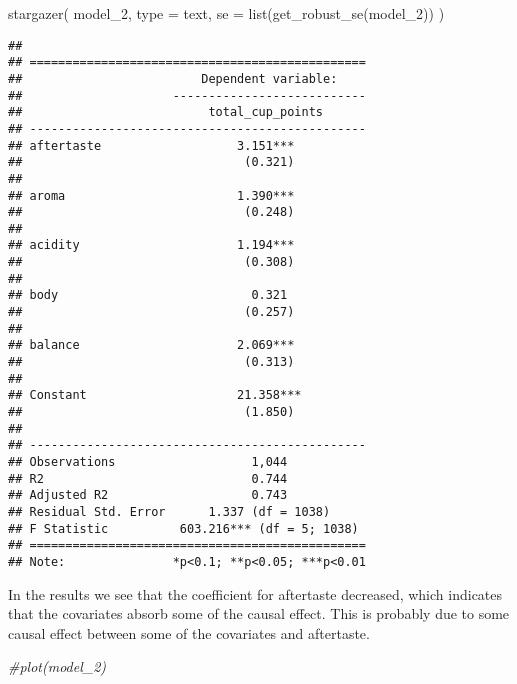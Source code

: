 \documentclass[
]{article}
\newenvironment{Shaded}{\begin{snugshade}}{\end{snugshade}}
\newcommand{\AttributeTok}[1]{\textcolor[rgb]{0.77,0.63,0.00}{#1}}
\newcommand{\CommentTok}[1]{\textcolor[rgb]{0.56,0.35,0.01}{\textit{#1}}}
\newcommand{\FunctionTok}[1]{\textcolor[rgb]{0.00,0.00,0.00}{#1}}
\newcommand{\NormalTok}[1]{#1}
\newcommand{\StringTok}[1]{\textcolor[rgb]{0.31,0.60,0.02}{#1}}
\begin{document}
\begin{Shaded}
\begin{Highlighting}[]
 \FunctionTok{stargazer}\NormalTok{(}
\NormalTok{   model\_2, }
   \AttributeTok{type =} \StringTok{\textquotesingle{}text\textquotesingle{}}\NormalTok{, }
   \AttributeTok{se =} \FunctionTok{list}\NormalTok{(}\FunctionTok{get\_robust\_se}\NormalTok{(model\_2))}
\NormalTok{   )}
\end{Highlighting}
\end{Shaded}

\begin{verbatim}
## 
## ===============================================
##                         Dependent variable:    
##                     ---------------------------
##                          total_cup_points      
## -----------------------------------------------
## aftertaste                   3.151***          
##                               (0.321)          
##                                                
## aroma                        1.390***          
##                               (0.248)          
##                                                
## acidity                      1.194***          
##                               (0.308)          
##                                                
## body                           0.321           
##                               (0.257)          
##                                                
## balance                      2.069***          
##                               (0.313)          
##                                                
## Constant                     21.358***         
##                               (1.850)          
##                                                
## -----------------------------------------------
## Observations                   1,044           
## R2                             0.744           
## Adjusted R2                    0.743           
## Residual Std. Error      1.337 (df = 1038)     
## F Statistic          603.216*** (df = 5; 1038) 
## ===============================================
## Note:               *p<0.1; **p<0.05; ***p<0.01
\end{verbatim}

In the results we see that the coefficient for aftertaste decreased,
which indicates that the covariates absorb some of the causal effect.
This is probably due to some causal effect between some of the
covariates and aftertaste.

\begin{Shaded}
\begin{Highlighting}[]
\CommentTok{\#plot(model\_2)}
\end{Highlighting}
\end{Shaded}
\end{document}
